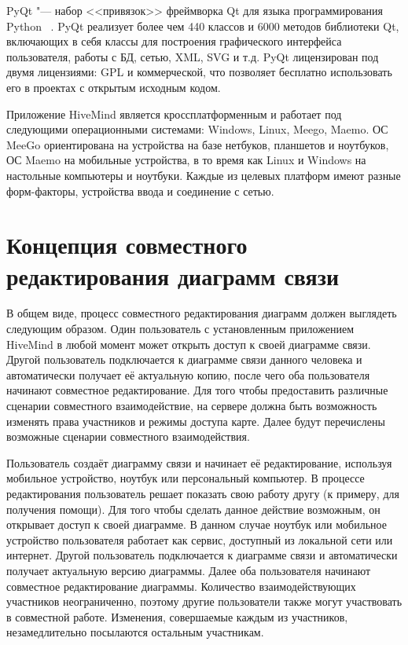 PyQt "--- набор <<привязок>> фреймворка Qt для языка программирования Python
~\cite{pyqt4}. PyQt реализует более чем 440 классов и 6000 методов библиотеки
Qt, включающих в себя классы для построения графического интерфейса
пользователя, работы с БД, сетью, XML, SVG и т.д. PyQt лицензирован под двумя
лицензиями: GPL и коммерческой, что позволяет бесплатно использовать его в
проектах с открытым исходным кодом.

Приложение HiveMind является кроссплатформенным и работает под следующими
операционными системами: Windows, Linux, Meego, Maemo. ОС MeeGo ориентирована на
устройства на базе нетбуков, планшетов и ноутбуков, ОС Maemo на мобильные
устройства, в то время как Linux и Windows на настольные компьютеры и ноутбуки.
Каждые из целевых платформ имеют разные форм-факторы, устройства ввода и
соединение с сетью.


\section{Концепция совместного редактирования диаграмм связи}
\label{sec:collaborative_mindmapping}
В общем виде, процесс совместного редактирования диаграмм должен выглядеть
следующим образом. Один пользователь с установленным приложением HiveMind в
любой момент может открыть доступ к своей диаграмме связи. Другой пользователь
подключается к диаграмме связи данного человека и автоматически получает её
актуальную копию, после чего оба пользователя начинают совместное
редактирование. Для того чтобы предоставить различные сценарии
совместного взаимодействие, на сервере должна быть возможность изменять права
участников и режимы доступа карте. Далее будут перечислены возможные сценарии
совместного взаимодействия.

Пользователь создаёт диаграмму связи и начинает её редактирование, используя
мобильное устройство, ноутбук или персональный компьютер. В процессе
редактирования пользователь решает показать свою работу другу (к примеру, для
получения помощи). Для того чтобы сделать данное действие возможным, он
открывает доступ к своей диаграмме. В данном случае ноутбук или мобильное
устройство пользователя работает как сервис, доступный из локальной сети или
интернет. Другой пользователь подключается к диаграмме связи и автоматически
получает актуальную версию диаграммы. Далее оба пользователя начинают совместное
редактирование диаграммы. Количество взаимодействующих участников неограниченно,
поэтому другие пользователи также могут участвовать в совместной работе.
Изменения, совершаемые каждым из участников, незамедлительно посылаются
остальным участникам.

